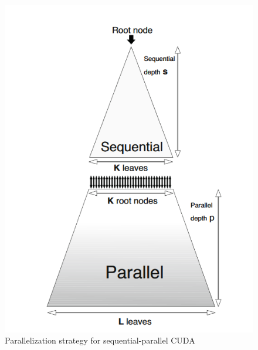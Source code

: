 \begin{figure}[!htbp]
    \centering
    \includegraphics[scale=0.45]{images/seqpar.PNG}
    \caption{Parallelization strategy for sequential-parallel CUDA \cite{Rocki}}
    \label{fig:seqpar}
\end{figure}

